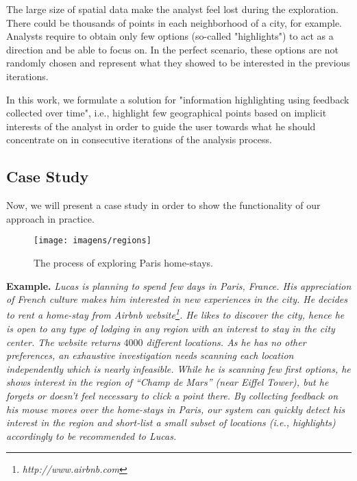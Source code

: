 The large size of spatial data make the analyst feel lost during the exploration. There could be thousands of points in each neighborhood of a city, for example. Analysts require to obtain only few options (so-called "highlights") to act as a direction and be able to focus on. In the perfect scenario, these options are not randomly chosen and represent what they showed to be interested in the previous iterations.

In this work, we formulate a solution for "information highlighting using feedback collected over time", i.e., highlight few geographical points based on implicit interests of the analyst in order to guide the user towards what he should concentrate on in consecutive iterations of the analysis process.


\subsection{Case Study}

Now, we will present a case study in order to show the functionality of our approach in practice.

\begin{figure}[t]
	\centering
	\texttt{[image: imagens/regions]}
	\caption{The process of exploring Paris home-stays.}
	\label{fig:regions}
\end{figure}

{\bf Example.} {\em Lucas is planning to spend few days in Paris, France. His appreciation of French culture makes him interested in new experiences in the city. He decides to rent a home-stay from Airbnb website\footnote{\it http://www.airbnb.com}. He likes to discover the city, hence he is open to any type of lodging in any region with an interest to stay in the city center. The website returns $4000$ different locations. As he has no other preferences, an exhaustive investigation needs scanning each location independently which is nearly infeasible. While he is scanning few first options, he shows interest in the region of ``Champ de Mars'' (near Eiffel Tower), but he forgets or doesn't feel necessary to click a point there. By collecting feedback on his mouse moves over the home-stays in Paris, our system can quickly detect his interest in the region and short-list a small subset of locations (i.e., highlights) accordingly to be recommended to Lucas.}

